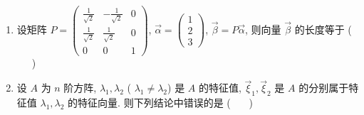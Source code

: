 \begin{enumerate}
	\item 设矩阵 $P = \begin{pmatrix} \frac{1}{\sqrt{2}} & -\frac{1}{\sqrt{2}} & 0 \\ \frac{1}{\sqrt{2}} & \frac{1}{\sqrt{2}} & 0 \\ 0 & 0 & 1 \end{pmatrix}$, $\vec{\alpha} = \begin{pmatrix} 1 \\ 2 \\ 3 \end{pmatrix}$, $\vec{\beta} = P\vec{\alpha}$, 则向量 $\vec{\beta}$ 的长度等于 ( \ \ \ )
	\vspace{0.5em}
	
	\item 设 $A$ 为 $n$ 阶方阵, $\lambda_1, \lambda_2$ ( $\lambda_1 \neq \lambda_2$) 是 $A$ 的特征值, $\vec{\xi}_1, \vec{\xi}_2$ 是 $A$ 的分别属于特征值 $\lambda_1, \lambda_2$ 的特征向量. 则下列结论中错误的是 ( \ \ \ )
	\vspace{0.5em}
	

\end{enumerate}
